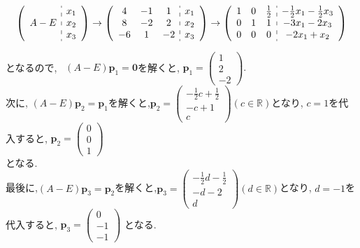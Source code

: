 \documentclass{jsarticle}
\begin{document}
$$
\begin{gathered}
\left(\begin{array}{c:c}
    & x_1 \\
A-E & x_2 \\
    & x_3
\end{array}\right) \rightarrow
\left(\begin{array}{ccc:c}
4 & -1 & 1 & x_1 \\
8 & -2 & 2 & x_2 \\
-6 & 1 & -2 & x_3
\end{array}\right) \rightarrow
\left(\begin{array}{ccc:c}
1 & 0 & \frac{1}{2} & -\frac{1}{2} x_1-\frac{1}{2} x_3 \\
0 & 1 & 1 & -3 x_1-2 x_3 \\
0 & 0 & 0 & -2 x_1+x_2
\end{array}\right) \\
\end{gathered}
$$

となるので, \ 
$(A-E) \bm{p}_1 = \bm{0}$を解くと, 
$\bm{p}_1=
\left(\begin{array}{c}
1 \\
2 \\
-2
\end{array}\right).$ \\
次に, $(A-E) \bm{p}_2=\bm{p}_1$を解くと,$\bm{p}_2=\left(\begin{array}{c}
-\frac{1}{2} c+\frac{1}{2} \\
-c+1 \\
c
\end{array}\right)
(c \in \mathbb{R})
$となり, 
$c=1$を代入すると, 
$\bm{p}_2=\left(\begin{array}{c}
0 \\
0 \\
1
\end{array}\right)$ \\
となる. \\
最後に,$(A-E) \bm{p}_3=\bm{p}_2$を解くと,$\bm{p}_3=\left(\begin{array}{c}
-\frac{1}{2} d-\frac{1}{2} \\
-d-2 \\
d
\end{array}\right)(d \in \mathbb{R})$となり, 
$d=-1$を代入すると, 
$\bm{p}_3=\left(\begin{array}{c}
0 \\
-1 \\
-1
\end{array}\right)$
となる.
\end{document}
